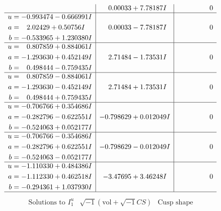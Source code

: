 \documentclass[1p]{elsarticle_modified}
\theoremstyle{definition}
\newcommand{\I}{\sqrt{-1}}
\begin{document}
$$\begin{array}{c|c|c}
 & \phantom{-}0.00033 + 7.78187 I & \phantom{-0.000000 } 0 \\ \hline\begin{aligned}
u &= -0.993474 - 0.666991 I \\
a &= \phantom{-}2.02429 + 0.50756 I \\
b &= -0.533965 + 1.230380 I\end{aligned}
 & \phantom{-}0.00033 - 7.78187 I & \phantom{-0.000000 } 0 \\ \hline\begin{aligned}
u &= \phantom{-}0.807859 + 0.884061 I \\
a &= -1.293630 + 0.452149 I \\
b &= \phantom{-}0.498444 - 0.759435 I\end{aligned}
 & \phantom{-}2.71484 - 1.73531 I & \phantom{-0.000000 } 0 \\ \hline\begin{aligned}
u &= \phantom{-}0.807859 - 0.884061 I \\
a &= -1.293630 - 0.452149 I \\
b &= \phantom{-}0.498444 + 0.759435 I\end{aligned}
 & \phantom{-}2.71484 + 1.73531 I & \phantom{-0.000000 } 0 \\ \hline\begin{aligned}
u &= -0.706766 + 0.354686 I \\
a &= -0.282796 - 0.622551 I \\
b &= -0.524063 + 0.052177 I\end{aligned}
 & -0.798629 + 0.012049 I & \phantom{-0.000000 } 0 \\ \hline\begin{aligned}
u &= -0.706766 - 0.354686 I \\
a &= -0.282796 + 0.622551 I \\
b &= -0.524063 - 0.052177 I\end{aligned}
 & -0.798629 - 0.012049 I & \phantom{-0.000000 } 0 \\ \hline\begin{aligned}
u &= -1.110330 + 0.484386 I \\
a &= -1.112330 + 0.462518 I \\
b &= -0.294361 + 1.037930 I\end{aligned}
 & -3.47695 + 3.46248 I & \phantom{-0.000000 } 0\\
 \hline 
 \end{array}$$\newpage$$\begin{array}{c|c|c}  
\text{Solutions to }I^u_{1}& \I (\text{vol} + \sqrt{-1}CS) & \text{Cusp shape}\\

\end{array}$$
\end{document}
